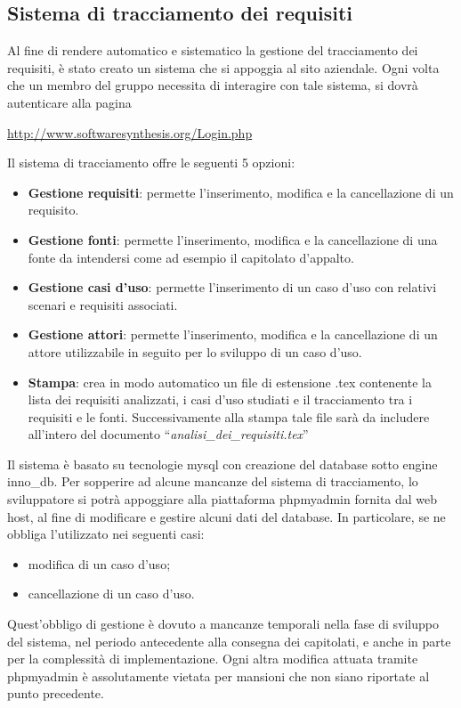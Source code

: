 \subsection{Sistema di tracciamento dei requisiti}
Al fine di rendere automatico e sistematico la gestione del tracciamento dei requisiti, è stato creato un sistema che si appoggia al sito aziendale. Ogni volta che un membro del gruppo necessita di interagire con tale sistema, si dovrà autenticare alla pagina
\newline
\begin{center}
\url{http://www.softwaresynthesis.org/Login.php}
\end{center}
Il sistema di tracciamento offre le seguenti 5 opzioni:
\begin{itemize}
\item \textbf{Gestione requisiti}: permette l'inserimento, modifica e la cancellazione di un requisito.
\item \textbf{Gestione fonti}: permette l'inserimento, modifica e la cancellazione di una fonte da intendersi come ad esempio il capitolato d'appalto.
\item \textbf{Gestione casi d'uso}: permette l'inserimento di un caso d'uso con relativi scenari  e requisiti associati.
\item \textbf{Gestione attori}: permette l'inserimento, modifica e la cancellazione di un attore utilizzabile in seguito per lo sviluppo di un caso d'uso.
\item \textbf{Stampa}: crea in modo automatico un file di estensione .tex contenente la lista dei requisiti analizzati, i casi d'uso studiati e il tracciamento tra i requisiti e le fonti. Successivamente alla stampa tale file sarà da includere all'intero del documento ``\textit{analisi\_dei\_requisiti.tex}''
\end{itemize}
Il sistema è basato su tecnologie mysql con creazione del database sotto engine inno\_db. Per sopperire ad alcune mancanze del sistema di tracciamento, lo sviluppatore si potrà appoggiare alla piattaforma phpmyadmin fornita dal web host, al fine di modificare e gestire alcuni dati del database. In particolare, se ne obbliga l'utilizzato nei seguenti casi:
\begin{itemize}
\item modifica di un caso d'uso;
\item cancellazione di un caso d'uso.
\end{itemize}
Quest'obbligo di gestione è dovuto a mancanze temporali nella fase di sviluppo del sistema, nel periodo antecedente alla consegna dei capitolati, e anche in parte per la complessità di implementazione.
\newline
Ogni altra modifica attuata tramite phpmyadmin è assolutamente vietata per mansioni che non siano riportate al punto precedente.


